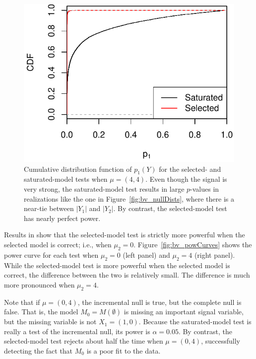 \documentclass{article}
\begin{document}
\begin{figure}
  \centering
  \includegraphics[width=.5\textwidth]{figs/bivariateSelVSat_rocCurve.pdf}
  \caption{Cumulative distribution function of $p_1(Y)$ for the selected- and saturated-model tests when $\mu=(4,4)$. Even though the signal is very strong, the saturated-model test results in large $p$-values in realizations like the one in Figure~\ref{fig:bv_nullDists}, where there is a near-tie between $|Y_1|$ and $|Y_2|$. By contrast, the selected-model test has nearly perfect power.}
  \label{fig:bv_rocCurve}
\end{figure}

Results in \citet{fithian2014optimal} show that the selected-model test is strictly more powerful when the selected model is correct; i.e., when $\mu_2=0$. Figure~\ref{fig:bv_powCurves} shows the power curve for each test when $\mu_2=0$ (left panel) and $\mu_2=4$ (right panel). While the selected-model test is more powerful when the selected model is correct, the difference between the two is relatively small. The difference is much more pronounced when $\mu_2=4$. 

Note that if $\mu=(0,4)$, the incremental null is true, but the complete null is false. That is, the model $M_0 = M(\emptyset)$ is missing an important signal variable, but the missing variable is not $X_1 = (1,0)$. Because the saturated-model test is really a test of the incremental null, its power is $\alpha=0.05$. By contrast, the selected-model test rejects about half the time when $\mu=(0,4)$, successfully detecting the fact that $M_0$ is a poor fit to the data.
\end{document}

